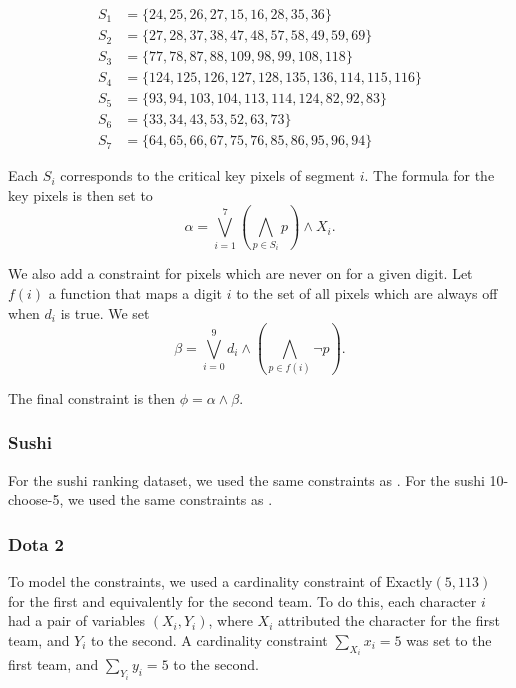 \begin{align*}
  S_1&=\{24, 25, 26, 27, 15, 16, 28, 35, 36\}\\
  S_2&=\{27, 28, 37, 38, 47, 48, 57, 58, 49, 59, 69\}\\
  S_3&=\{77, 78, 87, 88, 109, 98, 99, 108, 118\}\\
  S_4&=\{124, 125, 126, 127, 128, 135, 136, 114, 115, 116\}\\
  S_5&=\{93, 94, 103, 104, 113, 114, 124, 82, 92, 83\}\\
  S_6&=\{33, 34, 43, 53, 52, 63, 73\}\\
  S_7&=\{64, 65, 66, 67, 75, 76, 85, 86, 95, 96, 94\}
\end{align*}

Each $S_i$ corresponds to the critical key pixels of segment $i$. The formula for the key pixels
is then set to
\begin{equation*}
  \alpha=\bigvee_{i=1}^7\left(\bigwedge_{p\in S_i}p\right)\wedge X_i.
\end{equation*}

We also add a constraint for pixels which are never on for a given digit. Let $f(i)$ a function
that maps a digit $i$ to the set of all pixels which are always off when $d_i$ is true. We set
\begin{equation*}
  \beta=\bigvee_{i=0}^9 d_i\wedge\left(\bigwedge_{p\in f(i)}\neg p\right).
\end{equation*}

The final constraint is then $\phi=\alpha\wedge\beta$.

\subsubsection{Sushi}

For the sushi ranking dataset, we used the same constraints as \citep{choi15}. For the sushi
10-choose-5, we used the same constraints as \citep{shen17}.

\subsubsection{Dota 2}

To model the constraints, we used a cardinality constraint of $\text{Exactly}(5, 113)$ for the
first and equivalently for the second team. To do this, each character $i$ had a pair of variables
$(X_i,Y_i)$, where $X_i$ attributed the character for the first team, and $Y_i$ to the second. A
cardinality constraint $\sum_{X_i}x_i=5$ was set to the first team, and $\sum_{Y_i}y_i=5$ to the
second.

